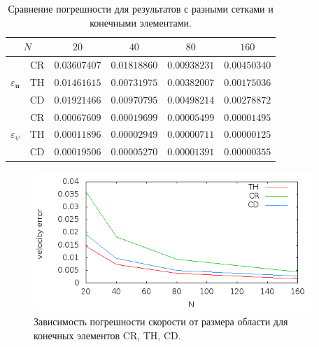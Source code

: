 \documentclass[12pt]{article}
\begin{document}
\begin{table}
    \begin{center}
	\begin{tabular}{|c|c|c|c|c|c|}
	    \hline	
	    \multicolumn{2}{|c|}{$N$} & $20$ & $40$ & $80$ & $160$ \\
	    \hline
	    \multirow{3}{*}{$\varepsilon_{\bm u}$} & CR & $0.03607407$ & $0.01818860$ & $0.00938231$ & $0.00450340$\\
	    
	     & TH & $0.01461615$ & $0.00731975$ & $0.00382007$ & $0.00175036$\\

	     & CD & $0.01921466$ & $0.00970795$ & $0.00498214$ & $0.00278872$\\
	    \hline
	    \multirow{3}{*}{$\varepsilon_{\psi}$} & CR & $0.00067609$ & $0.00019699$ & $0.00005499$ & $0.00001495$\\
	    
	     & TH & $0.00011896$ & $0.00002949$ & $0.00000711$ & $0.00000125$\\

	     & CD & $0.00019506$ & $0.00005270$ & $0.00001391$ & $0.00000355$\\
	    \hline
	\end{tabular}	
	\caption{Сравнение погрешности для результатов с разными сетками и конечными элементами.}
	\label{tb:err}	 
	\end{center}
\end{table}	

\begin{figure}
	\begin{center}
		\includegraphics[width=400px]{pics/u_err}
		\caption{Зависимость погрешности скорости от размера области для конечных элементов CR, TH, CD.}
		\label{fg:u_err}
	\end{center}
\end{figure}
\end{document}
